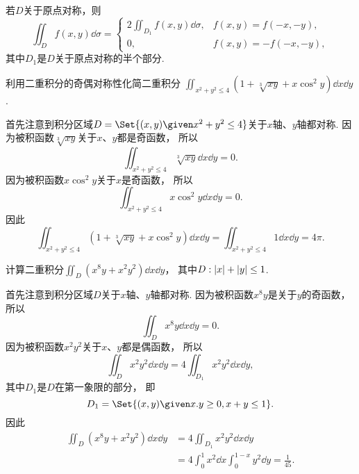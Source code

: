 若\(D\)关于原点对称，则\[
	\iint_D f(x,y) \dd\sigma
	= \left\{ \begin{array}{cc}
		2 \iint_{D_1} f(x,y) \dd\sigma, & f(x,y) = f(-x,-y), \\
		0, & f(x,y) = -f(-x,-y),
	\end{array} \right.
\]
其中\(D_1\)是\(D\)关于原点对称的半个部分.

\begin{example}
利用二重积分的奇偶对称性化简二重积分
\(\iint_{x^2+y^2\leq4} (1+\sqrt[3]{xy}+x \cos^2y) \dd{x}\dd{y}\).
\begin{solution}
首先注意到积分区域\(D = \Set{ (x,y) \given x^2+y^2\leq4 }\)关于\(x\)轴、\(y\)轴都对称.
因为被积函数\(\sqrt[3]{xy}\)关于\(x\)、\(y\)都是奇函数，
所以\begin{equation*}
	\iint_{x^2+y^2\leq4} \sqrt[3]{xy} \dd{x}\dd{y} = 0.
\end{equation*}
因为被积函数\(x \cos^2y\)关于\(x\)是奇函数，
所以\begin{equation*}
	\iint_{x^2+y^2\leq4} x \cos^2y \dd{x}\dd{y} = 0.
\end{equation*}
因此\begin{equation*}
	\iint_{x^2+y^2\leq4} (1+\sqrt[3]{xy}+x \cos^2y) \dd{x}\dd{y}
	= \iint_{x^2+y^2\leq4} 1 \dd{x}\dd{y}
	= 4\pi.
\end{equation*}
\end{solution}
\end{example}
\begin{example}
计算二重积分\(\iint_D (x^8y+x^2y^2) \dd{x}\dd{y}\)，
其中\(D: \abs{x}+\abs{y}\leq1\).
\begin{solution}
首先注意到积分区域\(D\)关于\(x\)轴、\(y\)轴都对称.
因为被积函数\(x^8y\)是关于\(y\)的奇函数，
所以\begin{equation*}
	\iint_D x^8y \dd{x}\dd{y} = 0.
\end{equation*}
因为被积函数\(x^2y^2\)关于\(x\)、\(y\)都是偶函数，
所以\begin{equation*}
	\iint_D x^2y^2 \dd{x}\dd{y}
	= 4 \iint_{D_1} x^2y^2 \dd{x}\dd{y},
\end{equation*}
其中\(D_1\)是\(D\)在第一象限的部分，
即\begin{equation*}
	D_1 = \Set{ (x,y) \given x.y\geq0,x+y\leq1 }.
\end{equation*}
因此\begin{align*}
	\iint_D (x^8y+x^2y^2) \dd{x}\dd{y}
	&= 4 \iint_{D_1} x^2y^2 \dd{x}\dd{y} \\
	&= 4 \int_0^1 x^2 \dd{x} \int_0^{1-x} y^2 \dd{y}
	= \frac1{45}.
\end{align*}
\end{solution}
\end{example}

